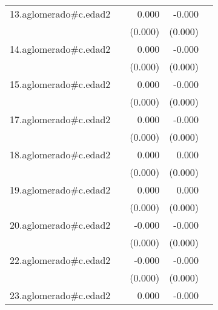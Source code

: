 {\begin{longtable}{l*{4}{D{.}{.}{-1}}}
\addlinespace
13.aglomerado#c.edad2&                     &       0.000         &      -0.000         &                     \\
            &                     &     (0.000)         &     (0.000)         &                     \\
\addlinespace
14.aglomerado#c.edad2&                     &       0.000         &      -0.000         &                     \\
            &                     &     (0.000)         &     (0.000)         &                     \\
\addlinespace
15.aglomerado#c.edad2&                     &       0.000         &      -0.000         &                     \\
            &                     &     (0.000)         &     (0.000)         &                     \\
\addlinespace
17.aglomerado#c.edad2&                     &       0.000         &      -0.000         &                     \\
            &                     &     (0.000)         &     (0.000)         &                     \\
\addlinespace
18.aglomerado#c.edad2&                     &       0.000         &       0.000         &                     \\
            &                     &     (0.000)         &     (0.000)         &                     \\
\addlinespace
19.aglomerado#c.edad2&                     &       0.000\sym{*}  &       0.000         &                     \\
            &                     &     (0.000)         &     (0.000)         &                     \\
\addlinespace
20.aglomerado#c.edad2&                     &      -0.000         &      -0.000\sym{**} &                     \\
            &                     &     (0.000)         &     (0.000)         &                     \\
\addlinespace
22.aglomerado#c.edad2&                     &      -0.000         &      -0.000\sym{*}  &                     \\
            &                     &     (0.000)         &     (0.000)         &                     \\
\addlinespace
23.aglomerado#c.edad2&                     &       0.000         &      -0.000         &                     \\

\end{longtable}}
